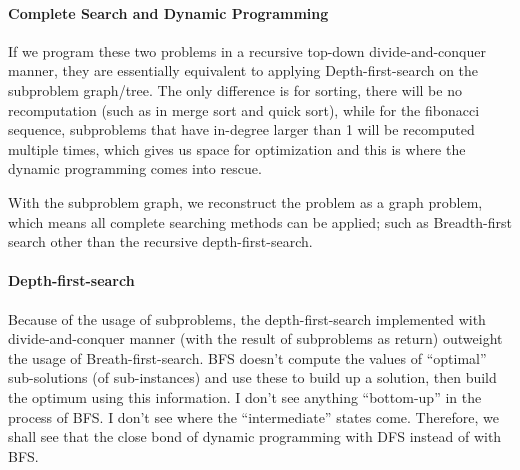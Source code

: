 \documentclass[../main.tex]{subfiles}
\begin{document}
\paragraph{Complete Search and Dynamic Programming} If we program these two problems in a recursive top-down  divide-and-conquer manner, they are essentially equivalent to applying Depth-first-search on the subproblem graph/tree. The only difference is for sorting, there will be no recomputation (such as in merge sort and quick sort), while for the fibonacci sequence, subproblems that have in-degree larger than 1 will be recomputed multiple times, which gives us space for optimization and this is where the dynamic programming comes into rescue.  

With the subproblem graph, we reconstruct the problem as a graph problem, which means all complete searching methods can be applied; such as Breadth-first search other than the recursive depth-first-search. 

\paragraph{Depth-first-search} Because of the usage of subproblems, the depth-first-search implemented with divide-and-conquer manner (with the result of subproblems as return) outweight the usage of Breath-first-search. BFS doesn’t compute the values of “optimal” sub-solutions (of sub-instances) and use these to build up a solution, then build the optimum using this information. I don’t see anything “bottom-up” in the process of BFS. I don’t see where the “intermediate” states come. Therefore, we shall see that the close bond of dynamic programming with DFS instead of with BFS.


\end{document}
